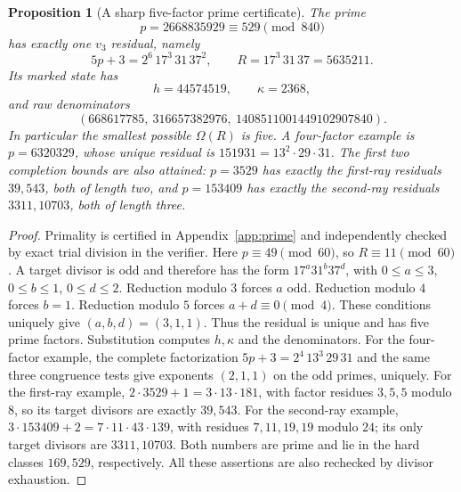 \documentclass[11pt]{article}
\newtheorem{proposition}[theorem]{Proposition}
\theoremstyle{remark}\newtheorem{remark}[theorem]{Remark}
\newcommand{\Om}{\Omega}
\begin{document}
\begin{proposition}[A sharp five-factor prime certificate]\label{prop:sharp}
The prime
\[
 p=2668835929\equiv529\pmod{840}
\]
has exactly one $v_3$ residual, namely
\[
 5p+3=2^6\,17^3\,31\,37^2,\qquad R=17^3\,31\,37=5635211.
\]
Its marked state has
\[
 h=44574519,\qquad\kappa=2368,
\]
and raw denominators
\[
 (668617785,\ 316657382976,\ 1408511001449102907840).
\]
In particular the smallest possible $\Om(R)$ is five. A four-factor example is $p=6320329$, whose unique residual is $151931=13^2\cdot29\cdot31$. The first two completion bounds are also attained: $p=3529$ has exactly the first-ray residuals $39,543$, both of length two, and $p=153409$ has exactly the second-ray residuals $3311,10703$, both of length three.
\end{proposition}
\begin{proof}
Primality is certified in Appendix~\ref{app:prime} and independently checked by exact trial division in the verifier. Here $p\equiv49\pmod{60}$, so $R\equiv11\pmod{60}$. A target divisor is odd and therefore has the form $17^a31^b37^d$, with $0\le a\le3$, $0\le b\le1$, $0\le d\le2$. Reduction modulo $3$ forces $a$ odd. Reduction modulo $4$ forces $b=1$. Reduction modulo $5$ forces $a+d\equiv0\pmod4$. These conditions uniquely give $(a,b,d)=(3,1,1)$. Thus the residual is unique and has five prime factors. Substitution computes $h,\kappa$ and the denominators. For the four-factor example, the complete factorization $5p+3=2^4\,13^3\,29\,31$ and the same three congruence tests give exponents $(2,1,1)$ on the odd primes, uniquely. For the first-ray example, $2\cdot3529+1=3\cdot13\cdot181$, with factor residues $3,5,5$ modulo $8$, so its target divisors are exactly $39,543$. For the second-ray example, $3\cdot153409+2=7\cdot11\cdot43\cdot139$, with residues $7,11,19,19$ modulo $24$; its only target divisors are $3311,10703$. Both numbers are prime and lie in the hard classes $169,529$, respectively. All these assertions are also rechecked by divisor exhaustion.
\end{proof}
\end{document}
